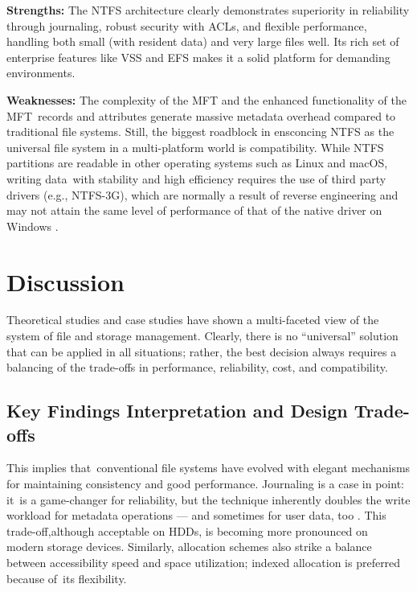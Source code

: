 \documentclass[12pt]{article}
\begin{document}
\textbf{Strengths:} The NTFS architecture clearly demonstrates superiority in reliability through journaling, robust security with ACLs, and flexible performance, handling both small (with resident data) and very large files well. Its rich set of enterprise features like VSS and EFS makes it a solid platform for demanding environments.

\textbf{Weaknesses:} The complexity of the MFT and the enhanced functionality of the MFT records and attributes generate massive metadata overhead compared to traditional file systems. Still, the biggest roadblock in ensconcing NTFS as the universal file system in a multi-platform world is compatibility. While NTFS partitions are readable in other operating systems such as Linux and macOS, writing data with stability and high efficiency requires the use of third party drivers (e.g., NTFS-3G), which are normally a result of reverse engineering and may not attain the same level of performance of that of the native driver on Windows \parencite{Dhjaku2019}. 


\section{Discussion}
Theoretical studies and case studies have shown a multi-faceted view of the system of file and storage management. Clearly, there is no “universal” solution that can be applied in all situations; rather, the best decision always requires a balancing of the trade-offs in performance, reliability, cost, and compatibility.

\subsection{Key Findings Interpretation and Design Trade-offs}
This implies that conventional file systems have evolved with elegant mechanisms for maintaining consistency and good performance. Journaling is a case in point: it is a game-changer for reliability, but the technique inherently doubles the write workload for metadata operations — and sometimes for user data, too \parencite{Lu2013Extending}. This trade-off,although acceptable on HDDs, is becoming more pronounced on   modern storage devices. Similarly, allocation schemes also strike a balance between accessibility speed and space utilization; indexed allocation is preferred because of its flexibility.
\end{document}
